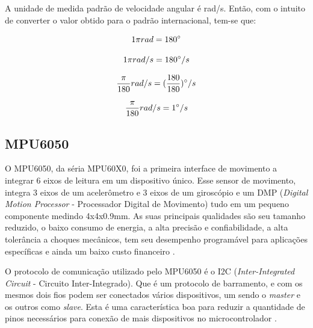 			A unidade de medida padrão de velocidade angular  é rad/s. Então, com o intuito de converter o valor obtido para o padrão internacional, tem-se que:
			
			\begin{equation}
			1 \pi rad = 180\degree
			\end{equation}
			
			\begin{equation}
			1 \pi rad /s = 180\degree/s 
			\end{equation}
			
			\begin{equation}
			 \frac{\pi}{180} rad /s = (\frac{180}{180})\degree/s 
			\end{equation}
			
			\begin{equation}
			\frac{\pi}{180} rad /s = 1\degree/s 
			\end{equation}


\subsection{MPU6050}
	
	O MPU6050, da séria MPU60X0, foi a primeira interface de movimento a integrar 6 eixos de leitura em um dispositivo único. Esse sensor de movimento, integra 3 eixos de um acelerômetro e 3 eixos de um giroscópio e um DMP (\textit{Digital Motion Processor} - Processador Digital de Movimento) tudo em um pequeno componente medindo 4x4x0.9mm. As suas principais qualidades são seu tamanho reduzido, o baixo consumo de energia, a alta precisão e confiabilidade, a alta tolerância a choques mecânicos, tem seu desempenho programável para aplicações específicas e ainda um baixo custo financeiro \cite{mpu6050}.
	
	O protocolo de comunicação utilizado pelo MPU6050 é o I2C (\textit{Inter-Integrated Circuit} - Circuito Inter-Integrado). Que é um protocolo de barramento, e com os mesmos dois fios podem ser conectados vários dispositivos, um sendo o \textit{master} e os outros como \textit{slave}. Esta é uma característica boa para reduzir a quantidade de pinos necessários para conexão de mais dispositivos no microcontrolador \cite{mpu6050}.
	
